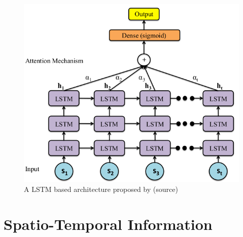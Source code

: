     \begin{figure}[H] 
    \begin{center}
        \includegraphics[height=0.6\textwidth]{images/2019_DLSTM_MI_arc.png}
        \caption{A LSTM based architecture proposed by \cite{2019_DLSTM_MI}(source)}
        \label{fig:2019_DLSTM_MI_arc}
    \end{center}    
    \end{figure}

\section{Spatio-Temporal Information}

